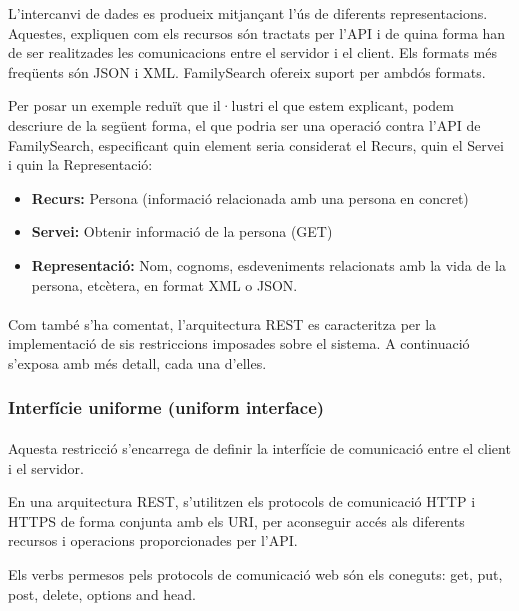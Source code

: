     L'intercanvi de dades es produeix mitjançant l'ús de diferents representacions. Aquestes, expliquen com els recursos són tractats per l’\gls{API} i de quina forma han de ser realitzades les comunicacions entre el servidor i el client. Els formats més freqüents són JSON i XML. FamilySearch ofereix suport per ambdós formats.

    Per posar un exemple reduït que il·lustri el que estem explicant, podem descriure de la següent forma, el que podria ser una operació contra l'\gls{API} de FamilySearch, especificant quin element seria considerat el Recurs, quin el Servei i quin la Representació:

    \begin{itemize}
        \item \textbf{Recurs:} Persona (informació relacionada amb una persona en concret)
        \item \textbf{Servei:} Obtenir informació de la persona (GET)
        \item \textbf{Representació:} Nom, cognoms, esdeveniments relacionats amb la vida de la persona, etcètera, en format \gls{XML} o \gls{JSON}.
    \end{itemize}

    \paragraph{}
    Com també s'ha comentat, l’arquitectura \gls{REST} es caracteritza per la implementació de sis restriccions imposades sobre el sistema. A continuació s'exposa amb més detall, cada una d'elles.


    \subsubsection{Interfície uniforme (uniform interface)}

    \paragraph{}
    Aquesta restricció s'encarrega de definir la interfície de comunicació entre el client i el servidor.

    En una arquitectura REST, s'utilitzen els protocols de comunicació \gls{HTTP} i \gls{HTTPS} de forma conjunta amb els \gls{URI}, per aconseguir accés als diferents recursos i operacions proporcionades per l'\gls{API}.

    Els verbs permesos pels protocols de comunicació web són els coneguts: get, put, post, delete, options and head.

